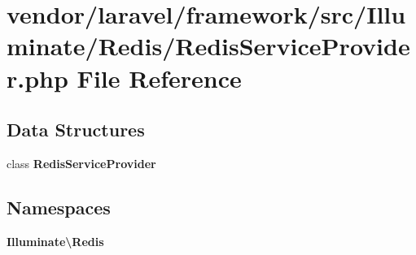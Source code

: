 \section{vendor/laravel/framework/src/\+Illuminate/\+Redis/\+Redis\+Service\+Provider.php File Reference}
\label{_redis_service_provider_8php}
\subsection*{Data Structures}
\begin{DoxyCompactItemize}
\item 
class {\bf Redis\+Service\+Provider}
\end{DoxyCompactItemize}
\subsection*{Namespaces}
\begin{DoxyCompactItemize}
\item 
 {\bf Illuminate\textbackslash{}\+Redis}
\end{DoxyCompactItemize}
